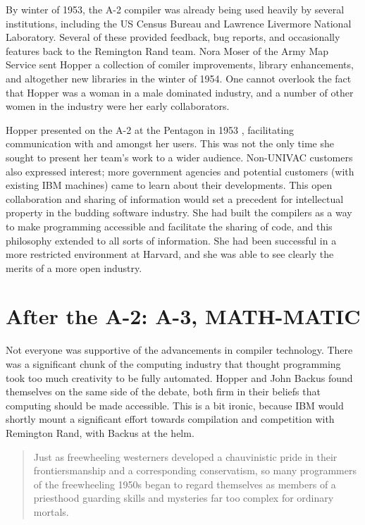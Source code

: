 By winter of 1953, the A-2 compiler was already being used heavily
by several institutions, including the US Census Bureau and
Lawrence Livermore National Laboratory.
Several of these provided feedback, bug reports, and occasionally features
back to the Remington Rand team.
Nora Moser of the Army Map Service sent Hopper a collection of comiler
improvements, library enhancements, and altogether new libraries in the
winter of 1954.
One cannot overlook the fact that Hopper was a woman in a male dominated
industry, and a number of other women in the industry were her early
collaborators.

Hopper presented on the A-2 at the Pentagon in 1953
\cite{pentagon_hopper_univac_workshop_1953},
facilitating communication with and amongst her users.
This was not the only time she sought to present her team's work
to a wider audience.
Non-UNIVAC customers also expressed interest; more government
agencies and potential customers (with existing IBM machines)
came to learn about their developments.
This open collaboration and sharing of information would set a precedent
for intellectual property in the budding software industry.
She had built the compilers as a way to make programming accessible
and facilitate the sharing of code, and this philosophy extended to
all sorts of information.
She had been successful in a more restricted environment at Harvard,
and she was able to see clearly the merits of a more open industry.

\section{After the A-2: A-3, MATH-MATIC}

Not everyone was supportive of the advancements in compiler technology.
There was a significant chunk of the computing industry that thought
programming took too much creativity to be fully automated.
Hopper and John Backus found themselves on the same side of the debate,
both firm in their beliefs that computing should be made accessible.
This is a bit ironic, because IBM would shortly mount a significant effort
towards compilation and competition with Remington Rand, with Backus at the helm.

\begin{quotation}
    Just as freewheeling westerners developed a chauvinistic pride in their 
frontiersmanship and a corresponding conservatism, so many programmers of the 
freewheeling 1950s began to regard themselves as members of a priesthood 
guarding skills and mysteries far too complex for ordinary mortals.
\cite{Backus_1980_Programming_in_America_in_1950s}
\end{quotation}

